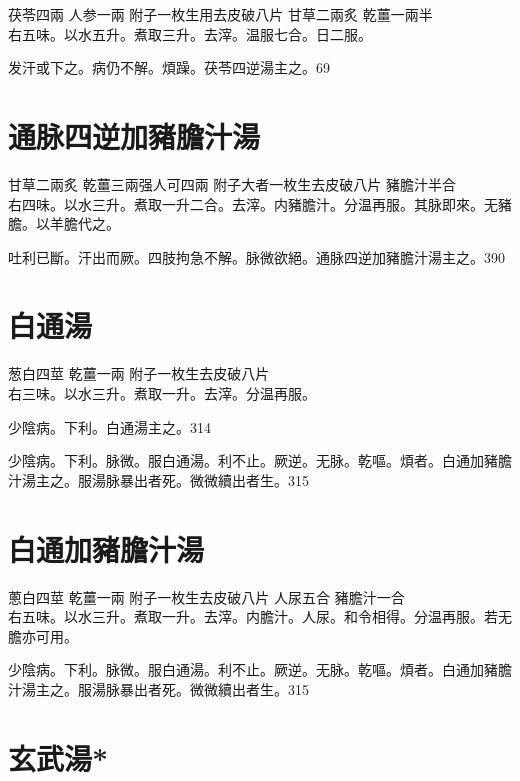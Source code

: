 茯苓{\scriptsize 四兩} 人参{\scriptsize 一兩} 附子{\scriptsize 一枚生用去皮破八片} 甘草{\scriptsize 二兩炙} 乾薑{\scriptsize 一兩半}\\
右五味。以水五升。煮取三升。去滓。温服七合。日二服。

发汗或下之。{\khaaitp 病仍}不解。煩躁。茯苓四逆湯主之。69

\section{通脉四逆加豬膽汁湯}

甘草{\scriptsize 二兩炙} 乾薑{\scriptsize 三兩强人可四兩} 附子{\scriptsize 大者一枚生去皮破八片} 豬膽汁{\scriptsize 半合}\\
右四味。以水三升。煮取一升二合。去滓。内豬膽汁。分温再服。其脉即來。无豬膽。以羊膽代之。

吐利已斷。汗出而厥。四肢拘急不解。脉微欲絕。通脉四逆加豬膽汁湯主之。390

\section{白通湯}

葱白{\scriptsize 四莖} 乾薑{\scriptsize 一兩} 附子{\scriptsize 一枚生去皮破八片}\\
右三味。以水三升。煮取一升。去滓。分温再服。

少陰病。下利。白通湯主之。314

少陰病。下利。脉微。服白通湯。利不止。厥逆。无脉。乾嘔。煩者。白通加豬膽汁湯主之。服湯脉暴出者死。微{\khaaitp 微}續{\khaaitp 出}者生。315

\section{白通加豬膽汁湯}

蔥白{\scriptsize 四莖} 乾薑{\scriptsize 一兩} 附子{\scriptsize 一枚生去皮破八片} 人尿{\scriptsize 五合} 豬膽汁{\scriptsize 一合}\\
右五味。以水三升。煮取一升。去滓。内膽汁。人尿。和令相得。分温再服。若无膽亦可用。

少陰病。下利。脉微。服白通湯。利不止。厥逆。无脉。乾嘔。煩者。白通加豬膽汁湯主之。服湯脉暴出者死。微{\khaaitp 微}續{\khaaitp 出}者生。315

\section{玄武湯*}

